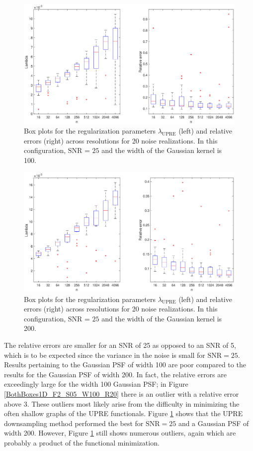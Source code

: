 \documentclass[12pt]{article}
\newcommand{\regparam}{\lambda}
\begin{document}
\begin{figure}
	\centerline{\includegraphics[scale = 0.4]{Figures/BothBoxes1D_F2_S25_W100_R20.eps}}
\caption{Box plots for the regularization parameters $\regparam_{\text{UPRE}}$  (left) and relative errors (right) across resolutions for 20 noise realizations. In this configuration, $\text{SNR = 25}$ and the width of the Gaussian kernel is 100.}
\end{figure}

\begin{figure}
	\centerline{\includegraphics[scale = 0.4]{Figures/BothBoxes1D_F2_S25_W200_R20.eps}}
\caption{Box plots for the regularization parameters $\regparam_{\text{UPRE}}$  (left) and relative errors (right) across resolutions for 20 noise realizations. In this configuration, $\text{SNR = 25}$ and the width of the Gaussian kernel is 200.}
\label{BothBoxes1D_F2_S25_W200_R20}
\end{figure}

The relative errors are smaller for an SNR of 25 as opposed to an SNR of 5, which is to be expected since the variance in the noise is small for $\text{SNR} = 25$. Results pertaining to the Gaussian PSF of width 100 are poor compared to the results for the Gaussian PSF of width 200. In fact, the relative errors are exceedingly large for the width 100 Gaussian PSF; in Figure \ref{BothBoxes1D_F2_S05_W100_R20} there is an outlier with a relative error above 3. These outliers most likely arise from the difficulty in minimizing the often shallow graphs of the UPRE functionals. Figure \ref{BothBoxes1D_F2_S25_W200_R20} shows that the UPRE downsampling method performed the best for $\text{SNR} = 25$ and a Gaussian PSF of width 200. However, Figure \ref{BothBoxes1D_F2_S25_W200_R20} still shows numerous outliers, again which are probably a product of the functional minimization. 
\end{document}
